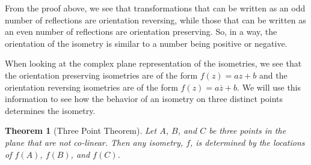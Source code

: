 \documentclass[
]{book}
\newtheorem{theorem}{Theorem}[chapter]
\theoremstyle{definition}
\theoremstyle{definition}
\theoremstyle{definition}
\theoremstyle{definition}
\theoremstyle{remark}
\begin{document}
From the proof above, we see that transformations that can be written as an odd number of reflections are orientation reversing, while those that can be written as an even number of reflections are orientation preserving. So, in a way, the orientation of the isometry is similar to a number being positive or negative.

When looking at the complex plane representation of the isometries, we see that the orientation preserving isometries are of the form \(f(z)=az+b\) and the orientation reversing isometries are of the form \(f(z)=a\overline{z}+b\). We will use this information to see how the behavior of an isometry on three distinct points determines the isometry.

\begin{theorem}[Three Point Theorem]
Let \(A\), \(B\), and \(C\) be three points in the plane that are not co-linear. Then any isometry, \(f\), is determined by the locations of \(f(A)\), \(f(B)\), and \(f(C)\).
\end{theorem}
\end{document}
